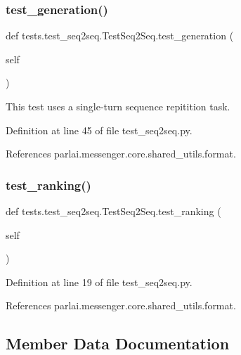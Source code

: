 \subsubsection{\texorpdfstring{test\+\_\+generation()}{test\_generation()}}
{\footnotesize\ttfamily def tests.\+test\+\_\+seq2seq.\+Test\+Seq2\+Seq.\+test\+\_\+generation (\begin{DoxyParamCaption}\item[{}]{self }\end{DoxyParamCaption})}

\begin{DoxyVerb}This test uses a single-turn sequence repitition task.\end{DoxyVerb}
 

Definition at line 45 of file test\+\_\+seq2seq.\+py.



References parlai.\+messenger.\+core.\+shared\+\_\+utils.\+format.

\mbox{\label{classtests_1_1test__seq2seq_1_1TestSeq2Seq_a967d49fc0e124148c7ac4488dd788bc7}} 
\subsubsection{\texorpdfstring{test\+\_\+ranking()}{test\_ranking()}}
{\footnotesize\ttfamily def tests.\+test\+\_\+seq2seq.\+Test\+Seq2\+Seq.\+test\+\_\+ranking (\begin{DoxyParamCaption}\item[{}]{self }\end{DoxyParamCaption})}



Definition at line 19 of file test\+\_\+seq2seq.\+py.



References parlai.\+messenger.\+core.\+shared\+\_\+utils.\+format.



\subsection{Member Data Documentation}
\mbox{\label{classtests_1_1test__seq2seq_1_1TestSeq2Seq_a5681e61335c043954e727fa9eb4b1eb3}} 
